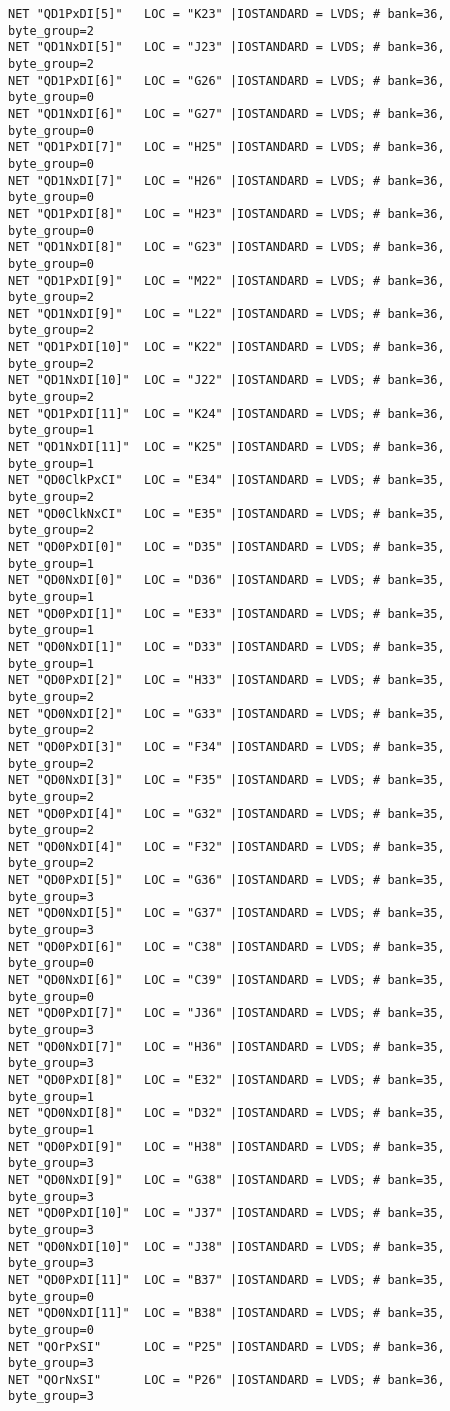 \begin{appendix}
\begin{verbatim}
NET "QD1PxDI[5]"   LOC = "K23" |IOSTANDARD = LVDS; # bank=36, byte_group=2
NET "QD1NxDI[5]"   LOC = "J23" |IOSTANDARD = LVDS; # bank=36, byte_group=2
NET "QD1PxDI[6]"   LOC = "G26" |IOSTANDARD = LVDS; # bank=36, byte_group=0
NET "QD1NxDI[6]"   LOC = "G27" |IOSTANDARD = LVDS; # bank=36, byte_group=0
NET "QD1PxDI[7]"   LOC = "H25" |IOSTANDARD = LVDS; # bank=36, byte_group=0
NET "QD1NxDI[7]"   LOC = "H26" |IOSTANDARD = LVDS; # bank=36, byte_group=0
NET "QD1PxDI[8]"   LOC = "H23" |IOSTANDARD = LVDS; # bank=36, byte_group=0
NET "QD1NxDI[8]"   LOC = "G23" |IOSTANDARD = LVDS; # bank=36, byte_group=0
NET "QD1PxDI[9]"   LOC = "M22" |IOSTANDARD = LVDS; # bank=36, byte_group=2
NET "QD1NxDI[9]"   LOC = "L22" |IOSTANDARD = LVDS; # bank=36, byte_group=2
NET "QD1PxDI[10]"  LOC = "K22" |IOSTANDARD = LVDS; # bank=36, byte_group=2
NET "QD1NxDI[10]"  LOC = "J22" |IOSTANDARD = LVDS; # bank=36, byte_group=2
NET "QD1PxDI[11]"  LOC = "K24" |IOSTANDARD = LVDS; # bank=36, byte_group=1
NET "QD1NxDI[11]"  LOC = "K25" |IOSTANDARD = LVDS; # bank=36, byte_group=1
NET "QD0ClkPxCI"   LOC = "E34" |IOSTANDARD = LVDS; # bank=35, byte_group=2
NET "QD0ClkNxCI"   LOC = "E35" |IOSTANDARD = LVDS; # bank=35, byte_group=2
NET "QD0PxDI[0]"   LOC = "D35" |IOSTANDARD = LVDS; # bank=35, byte_group=1
NET "QD0NxDI[0]"   LOC = "D36" |IOSTANDARD = LVDS; # bank=35, byte_group=1
NET "QD0PxDI[1]"   LOC = "E33" |IOSTANDARD = LVDS; # bank=35, byte_group=1
NET "QD0NxDI[1]"   LOC = "D33" |IOSTANDARD = LVDS; # bank=35, byte_group=1
NET "QD0PxDI[2]"   LOC = "H33" |IOSTANDARD = LVDS; # bank=35, byte_group=2
NET "QD0NxDI[2]"   LOC = "G33" |IOSTANDARD = LVDS; # bank=35, byte_group=2
NET "QD0PxDI[3]"   LOC = "F34" |IOSTANDARD = LVDS; # bank=35, byte_group=2
NET "QD0NxDI[3]"   LOC = "F35" |IOSTANDARD = LVDS; # bank=35, byte_group=2
NET "QD0PxDI[4]"   LOC = "G32" |IOSTANDARD = LVDS; # bank=35, byte_group=2
NET "QD0NxDI[4]"   LOC = "F32" |IOSTANDARD = LVDS; # bank=35, byte_group=2
NET "QD0PxDI[5]"   LOC = "G36" |IOSTANDARD = LVDS; # bank=35, byte_group=3
NET "QD0NxDI[5]"   LOC = "G37" |IOSTANDARD = LVDS; # bank=35, byte_group=3
NET "QD0PxDI[6]"   LOC = "C38" |IOSTANDARD = LVDS; # bank=35, byte_group=0
NET "QD0NxDI[6]"   LOC = "C39" |IOSTANDARD = LVDS; # bank=35, byte_group=0
NET "QD0PxDI[7]"   LOC = "J36" |IOSTANDARD = LVDS; # bank=35, byte_group=3
NET "QD0NxDI[7]"   LOC = "H36" |IOSTANDARD = LVDS; # bank=35, byte_group=3
NET "QD0PxDI[8]"   LOC = "E32" |IOSTANDARD = LVDS; # bank=35, byte_group=1
NET "QD0NxDI[8]"   LOC = "D32" |IOSTANDARD = LVDS; # bank=35, byte_group=1
NET "QD0PxDI[9]"   LOC = "H38" |IOSTANDARD = LVDS; # bank=35, byte_group=3
NET "QD0NxDI[9]"   LOC = "G38" |IOSTANDARD = LVDS; # bank=35, byte_group=3
NET "QD0PxDI[10]"  LOC = "J37" |IOSTANDARD = LVDS; # bank=35, byte_group=3
NET "QD0NxDI[10]"  LOC = "J38" |IOSTANDARD = LVDS; # bank=35, byte_group=3
NET "QD0PxDI[11]"  LOC = "B37" |IOSTANDARD = LVDS; # bank=35, byte_group=0
NET "QD0NxDI[11]"  LOC = "B38" |IOSTANDARD = LVDS; # bank=35, byte_group=0
NET "QOrPxSI"      LOC = "P25" |IOSTANDARD = LVDS; # bank=36, byte_group=3
NET "QOrNxSI"      LOC = "P26" |IOSTANDARD = LVDS; # bank=36, byte_group=3
\end{verbatim}


\end{appendix}
